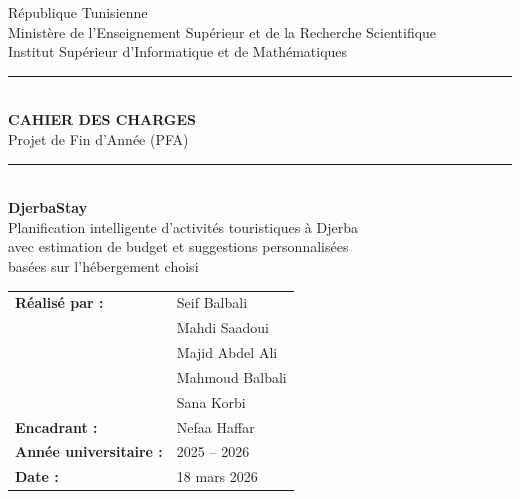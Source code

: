 \documentclass[12pt,a4paper]{report}
\begin{document}
\begin{titlepage}
  \centering
  \vspace*{1cm}

  {\large République Tunisienne}\\[4pt]
  {\large Ministère de l'Enseignement Supérieur et de la Recherche Scientifique}\\[4pt]
  {\large Institut Supérieur d'Informatique et de Mathématiques}\\[2cm]

  \rule{\textwidth}{1pt}\\[0.6cm]
  {\Huge\bfseries CAHIER DES CHARGES}\\[0.3cm]
  {\Large Projet de Fin d'Année (PFA)}\\[0.6cm]
  \rule{\textwidth}{1pt}\\[1.5cm]

  {\LARGE\bfseries DjerbaStay}\\[0.5cm]
  {\large Planification intelligente d'activités touristiques à Djerba\\
  avec estimation de budget et suggestions personnalisées\\
  basées sur l'hébergement choisi}\\[2.5cm]

  \begin{tabular}{ll}
    \textbf{Réalisé par :} & Seif Balbali \\
                           & Mahdi Saadoui \\
                           & Majid Abdel Ali \\
                           & Mahmoud Balbali \\
                           & Sana Korbi \\[0.6cm]
    \textbf{Encadrant :}   & Nefaa Haffar \\[0.6cm]
    \textbf{Année universitaire :} & 2025 -- 2026 \\
    \textbf{Date :}        & 18 mars 2026 \\
  \end{tabular}

  \vfill
\end{titlepage}

\tableofcontents
\newpage

\end{document}
